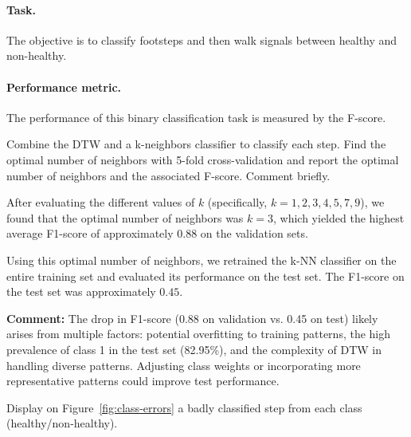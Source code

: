 \documentclass[11pt]{article}
\begin{document}
\paragraph{Task.} The objective is to classify footsteps and then walk signals between healthy and non-healthy.

\paragraph{Performance metric.} The performance of this binary classification task is measured by the F-score.


\begin{exercise}
Combine the DTW and a k-neighbors classifier to classify each step. Find the optimal number of neighbors with 5-fold cross-validation and report the optimal number of neighbors and the associated F-score. Comment briefly.
\end{exercise}

\begin{solution} %
    After evaluating the different values of \( k \) (specifically, \( k = 1, 2, 3, 4, 5, 7, 9 \)), we found that the optimal number of neighbors was \( k = 3 \), which yielded the highest average F1-score of approximately \( 0.88 \) on the validation sets.
    
    Using this optimal number of neighbors, we retrained the k-NN classifier on the entire training set and evaluated its performance on the test set. The F1-score on the test set was approximately \( 0.45 \).
    
    \textbf{Comment:} The drop in F1-score (0.88 on validation vs. 0.45 on test) likely arises from multiple factors: potential overfitting to training patterns, the high prevalence of class 1 in the test set (82.95\%), and the complexity of DTW in handling diverse patterns. Adjusting class weights or incorporating more representative patterns could improve test performance.    
\end{solution}

\newpage
\begin{exercise}\label{q:class-errors}
Display on Figure~\ref{fig:class-errors} a badly classified step from each class (healthy/non-healthy).
\end{exercise}
\end{document}
